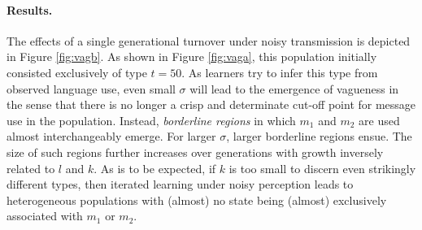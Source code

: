 \documentclass[10pt,a4paper]{article}
\begin{document}
\paragraph{Results.} The effects of a single generational turnover under noisy transmission is
depicted in Figure \ref{fig:vagb}. As shown in Figure \ref{fig:vaga}, this population initially
consisted exclusively of type $t = 50$.  As
learners try to infer this type from observed language use, even small $\sigma$ will lead to
the emergence of vagueness in the sense that there is no longer a crisp and determinate cut-off
point for message use in the population. Instead, \emph{borderline regions} in which $m_1$ and $m_2$
are used almost interchangeably emerge. For larger $\sigma$, larger borderline regions ensue. The size
of such regions further increases over generations with growth inversely related to $l$
and $k$. As is to be expected, if $k$ is too small to discern even strikingly different types,
then iterated learning under noisy perception leads to heterogeneous populations with (almost)
no state being (almost) exclusively associated with $m_1$ or $m_2$.
\end{document}
